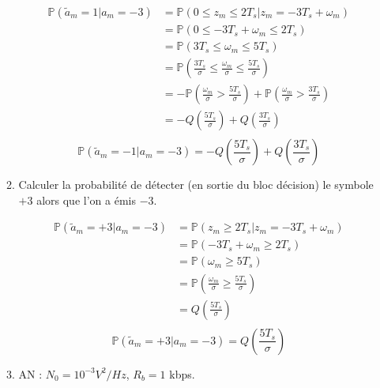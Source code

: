 \documentclass[frenchb]{article}
\begin{document}
\begin{enumerate}
\begin{enumerate}
                    \begin{equation*}
                    \begin{split}                    
                    \mathbb{P}\left(\tilde{a}_m = 1 |a_m = -3\right) & = \mathbb{P}\left(0 \leq z_m \leq 2 T_s | z_m = -3 T_s + \omega_m\right)\\
                    & = \mathbb{P}\left(0 \leq -3 T_s + \omega_m \leq 2 T_s\right) \\
                    & = \mathbb{P}\left(3 T_s \leq \omega_m \leq 5 T_s\right) \\
                    & = \mathbb{P}\left(\frac{3 T_s}{\sigma} \leq \frac{\omega_m}{\sigma} \leq \frac{5 T_s}{\sigma}\right) \\
                    & = - \mathbb{P}\left(\frac{\omega_m}{\sigma} > \frac{5 T_s}{\sigma} \right) + \mathbb{P}\left(\frac{\omega_m}{\sigma} > \frac{3 T_s}{\sigma} \right)\\
                    & = - Q\left(\frac{5 T_s}{\sigma} \right) + Q\left(\frac{3 T_s}{\sigma} \right)\\
                    \end{split}
                    \end{equation*}
                    $$\boxed{\mathbb{P}\left(\tilde{a}_m = -1 |a_m = -3\right) = - Q\left(\frac{5 T_s}{\sigma} \right) + Q\left(\frac{3 T_s}{\sigma} \right)}$$
                    \item Calculer la probabilité de détecter (en sortie du bloc décision) le symbole $+3$ alors que l'on a émis $-3$.
                    
                    \begin{equation*}
                    \begin{split}                    
                    \mathbb{P}\left(\tilde{a}_m = +3 |a_m = -3\right) & = \mathbb{P}\left(z_m \geq 2 T_s | z_m = -3 T_s + \omega_m\right)\\
                    & = \mathbb{P}\left(-3 T_s + \omega_m \geq 2 T_s\right) \\
                    & = \mathbb{P}\left(\omega_m \geq 5 T_s\right) \\
                    & = \mathbb{P}\left(\frac{\omega_m}{\sigma} \geq \frac{5 T_s}{\sigma}\right) \\
                    & = Q\left(\frac{5 T_s}{\sigma}\right)\\
                    \end{split}
                    \end{equation*}
                    $$ \boxed{\mathbb{P}\left(\tilde{a}_m = +3 |a_m = -3\right) = Q\left(\frac{5 T_s}{\sigma}\right)}$$
                    \item AN : $N_0=10^{-3} V^2/Hz$, $R_b=1$ kbps.
                    

\end{enumerate}
\end{enumerate}
\end{document}
